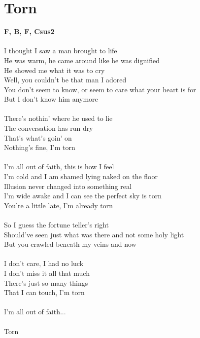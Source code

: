 \section{Torn}
\footnotesize\textbf{F, B\be , F, Csus2}\\
\\
\normalsize
{}I thought I saw a man brought to life\\
He was warm, he came around like he was dignified\\
He showed me what it was to cry\\
Well, you couldn't be that man I adored\\
You don't seem to know, or seem to care what your heart is for\\
But I don't know him anymore\\
\\
There's nothin' where he used to lie\\
The conversation has run dry\\
That's what's goin' on\\
Nothing's fine, I'm torn\\
\\
I'm all out of faith, this is how I feel\\
I'm cold and I am shamed lying naked on the floor\\
Illusion never changed into something real\\
I'm wide awake and I can see the perfect sky is torn\\
You're a little late, I'm already torn\\
\\
So I guess the fortune teller's right\\
Should've seen just what was there and not some holy light\\
But you crawled beneath my veins and now\\
\\
I don't care, I had no luck\\
I don't miss it all that much\\
There's just so many things\\
That I can touch, I'm torn\\
\\
I'm all out of faith...\\
\\
Torn\\
\\
